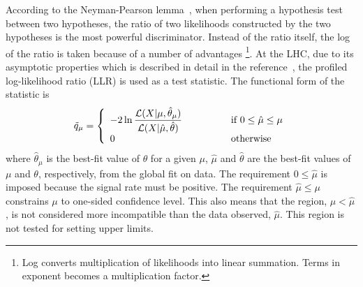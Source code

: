 %
According to the Neyman-Pearson lemma~\cite{neymanpearson}, 
when performing a hypothesis test between two hypotheses,
the ratio of two likelihoods constructed by the two hypotheses
is the most powerful discriminator. Instead of the ratio itself, 
the log of the ratio is taken because of a number of advantages
\footnote{Log converts multiplication of likelihoods into linear summation. 
Terms in exponent becomes a multiplication factor.}.  
At the LHC, due to its asymptotic properties which is described in detail 
in the reference~\cite{cowan_asimov}, 
the profiled log-likelihood ratio (LLR) is used as a test statistic.   
The functional form of the statistic is 
\begin{eqnarray} 
\tilde{q}_\mu 
= 
\left\{ \begin{array}{l l}
\displaystyle
-2 \ln \frac{\mathcal{L} ( X | \mu, \hat{\theta}_\mu)}
            {\mathcal{L} ( X | \hat{\mu}, \hat{\theta})}  
            & \quad \quad \quad \quad \textrm{if } 0 \le \hat{\mu} \le \mu \\
0           & \quad \quad \quad \quad \textrm{otherwise}
\end{array} \right.
\end{eqnarray}  
where $\hat{\theta}_\mu$ is the best-fit value of $\theta$ for a given $\mu$, 
$\hat{\mu}$ and $\hat{\theta}$ are the best-fit values of 
$\mu$ and $\theta$, respectively, from the global fit on data.
The requirement $0 \le \hat{\mu}$ is imposed because the signal rate must be positive. 
The requirement $\hat{\mu} \le \mu$ constrains $\mu$ to one-sided confidence level. 
This also means that the region, $\mu < \hat{\mu}$, is not considered  
more incompatible than the data observed, $\hat{\mu}$. This region 
is not tested for setting upper limits.
%

